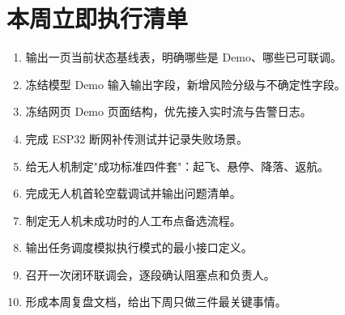 \documentclass[12pt,a4paper,openany]{ctexrep}
\begin{document}
\chapter{本周立即执行清单}

\begin{enumerate}
\item 输出一页当前状态基线表，明确哪些是 Demo、哪些已可联调。
\item 冻结模型 Demo 输入输出字段，新增风险分级与不确定性字段。
\item 冻结网页 Demo 页面结构，优先接入实时流与告警日志。
\item 完成 ESP32 断网补传测试并记录失败场景。
\item 给无人机制定"成功标准四件套"：起飞、悬停、降落、返航。
\item 完成无人机首轮空载调试并输出问题清单。
\item 制定无人机未成功时的人工布点备选流程。
\item 输出任务调度模拟执行模式的最小接口定义。
\item 召开一次闭环联调会，逐段确认阻塞点和负责人。
\item 形成本周复盘文档，给出下周只做三件最关键事情。
\end{enumerate}
\end{document}
